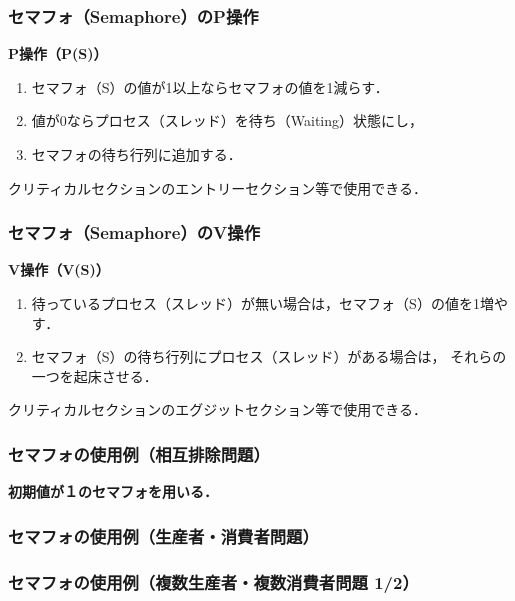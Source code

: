 \documentclass[dvipdfmx]{beamer}
\begin{document}
\begin{frame}
  \frametitle{セマフォ（Semaphore）のP操作}
  {\bf P操作（P(S)）}
  \begin{enumerate}
  \item セマフォ（S）の値が1以上ならセマフォの値を1減らす．
  \item 値が0ならプロセス（スレッド）を待ち（Waiting）状態にし，
  \item セマフォの待ち行列に追加する．
  \end{enumerate}
  クリティカルセクションのエントリーセクション等で使用できる．

  \begin{center}
    \begin{minipage}{0.6\columnwidth}
      
    \end{minipage}
  \end{center}
\end{frame}

\begin{frame}
  \frametitle{セマフォ（Semaphore）のV操作}
  {\bf V操作（V(S)）}
  \begin{enumerate}
  \item 待っているプロセス（スレッド）が無い場合は，セマフォ（S）の値を1増やす．
  \item セマフォ（S）の待ち行列にプロセス（スレッド）がある場合は，
    それらの一つを起床させる．
  \end{enumerate}
  クリティカルセクションのエグジットセクション等で使用できる．

  \begin{center}
    \begin{minipage}{0.6\columnwidth}
      
    \end{minipage}
  \end{center}
\end{frame}

\begin{frame}
  \frametitle{セマフォの使用例（相互排除問題）}
  
  {\bf 初期値が１のセマフォを用いる．}
\end{frame}

\begin{frame}
  \frametitle{セマフォの使用例（生産者・消費者問題）}
  
\end{frame}

\begin{frame}
  \frametitle{セマフォの使用例（複数生産者・複数消費者問題 1/2）}
  
\end{frame}
\end{document}
